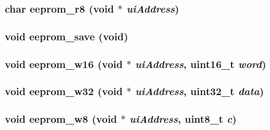 \subsubsection{\setlength{\rightskip}{0pt plus 5cm}char eeprom\_\-r8 (void $\ast$ {\em uiAddress})}\label{eeprom_8h_af8e0160a22f011071c6eef05108dd02}


\subsubsection{\setlength{\rightskip}{0pt plus 5cm}void eeprom\_\-save (void)}\label{eeprom_8h_967222c6b1a76007b1656eca35ff7c08}


\subsubsection{\setlength{\rightskip}{0pt plus 5cm}void eeprom\_\-w16 (void $\ast$ {\em uiAddress}, uint16\_\-t {\em word})}\label{eeprom_8h_acd26e87298620ea075952631cdfe66a}


\subsubsection{\setlength{\rightskip}{0pt plus 5cm}void eeprom\_\-w32 (void $\ast$ {\em uiAddress}, uint32\_\-t {\em data})}\label{eeprom_8h_f83bc20fbdc5083109537fd2db28fa13}


\subsubsection{\setlength{\rightskip}{0pt plus 5cm}void eeprom\_\-w8 (void $\ast$ {\em uiAddress}, uint8\_\-t {\em c})}\label{eeprom_8h_b66d92098db926da6dd7f28c9886d884}


